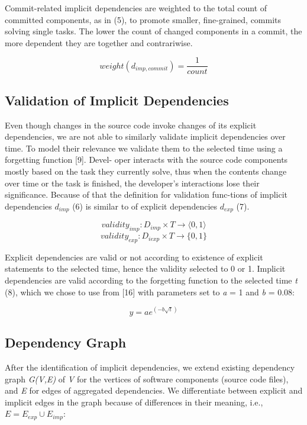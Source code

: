 \documentclass[a4paper]{llncs}
\begin{document}
Commit-related implicit dependencies are weighted to the total count of committed components, as in (5), to promote smaller, fine-grained, commits solving single tasks. The lower the count of changed components in a commit, the more dependent they are together and contrariwise.

 \begin{equation}
 weight(d_{imp,commit}) = \dfrac{1}{count} 
 \label{vzorec5}
 \end{equation}
 
 \subsection{Validation of Implicit Dependencies}
 Even though changes in the source code invoke changes of its explicit dependencies, we are not able to similarly validate implicit dependencies over time. To model their relevance we validate them to the selected time using a forgetting function [9]. Devel- oper interacts with the source code components mostly based on the task they currently solve, thus when the contents change over time or the task is finished, the developer’s interactions lose their significance. Because of that the definition for validation func-tions of implicit dependencies \textit{$d_{imp}$} (6) is similar to of explicit dependencies \textit{$d_{exp}$} (7).
 \newpage
 
 \begin{equation}
 validity_{imp}: D_{imp}\times T\rightarrow\langle0,1\rangle 
 \label{vzorec6}
 \end{equation}
 \begin{equation}
 validity_{exp}: D_{iexp}\times T\rightarrow\lbrace0,1\rbrace
 \label{vzorec7} 
 \end{equation}
 
 \noindent Explicit dependencies are valid or not according to existence of explicit statements to the selected time, hence the validity selected to 0 or 1. Implicit dependencies are valid according to the forgetting function to the selected time \textit{t} (8), which we chose to use from [16] with parameters set to \textit{a} = 1 and \textit{b} = 0.08:
 
 \begin{equation}
 y = ae^{(-b\sqrt{t})}
 \end{equation}
 
 \subsection{Dependency Graph}
 After the identification of implicit dependencies, we extend existing dependency graph \textit{G(V,E)} of \textit{V} for the vertices of software components (source code files), and \textit{E} for edges of aggregated dependencies. We differentiate between explicit and implicit edges in the graph because of differences in their meaning, i.e., \textit{$E=E_{exp}\cup E_{imp}$}: 
 
\end{document}
